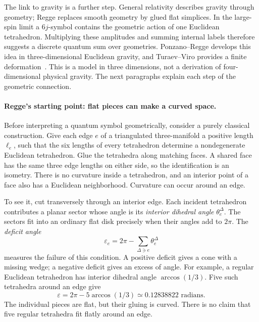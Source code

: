 \begin{physicsbox}
The link to gravity is a further step. General relativity describes
gravity through geometry; Regge replaces smooth geometry by glued
flat simplices. In the large-spin limit a $6j$-symbol contains the
geometric action of one Euclidean tetrahedron. Multiplying these
amplitudes and summing internal labels therefore suggests a discrete
quantum sum over geometries. Ponzano--Regge develops this idea in
three-dimensional Euclidean gravity, and Turaev--Viro provides a
finite deformation~\cite{BarrettNaishGuzman}. This is a model in
three dimensions, not a derivation of four-dimensional physical
gravity. The next paragraphs explain each step of the geometric
connection.
\end{physicsbox}

\paragraph{Regge's starting point: flat pieces can make a curved space.}
Before interpreting a quantum symbol geometrically, consider a purely
classical construction. Give each edge $e$ of a triangulated
three-manifold a positive length $\ell_e$, such that the six lengths
of every tetrahedron determine a nondegenerate Euclidean tetrahedron.
Glue the tetrahedra along matching faces. A shared face has the same
three edge lengths on either side, so the identification is an isometry.
There is no curvature inside a tetrahedron, and an interior point of a
face also has a Euclidean neighborhood. Curvature can occur around
an edge.

To see it, cut transversely through an interior edge. Each incident
tetrahedron contributes a planar sector whose angle is its
\emph{interior dihedral angle} $\theta_e^\Delta$. The sectors fit
into an ordinary flat disk precisely when their angles add to $2\pi$.
The \emph{deficit angle}
\[
 \varepsilon_e=2\pi-\sum_{\Delta\ni e}\theta_e^\Delta
\]
measures the failure of this condition. A positive deficit gives a
cone with a missing wedge; a negative deficit gives an excess of angle.
For example, a regular Euclidean tetrahedron has interior dihedral
angle $\arccos(1/3)$. Five such tetrahedra around an edge give
\[
 \varepsilon=2\pi-5\arccos(1/3)\simeq0.12838822\text{ radians}.
\]
The individual pieces are flat, but their gluing is curved.
There is no claim that five regular tetrahedra fit flatly around an edge.

